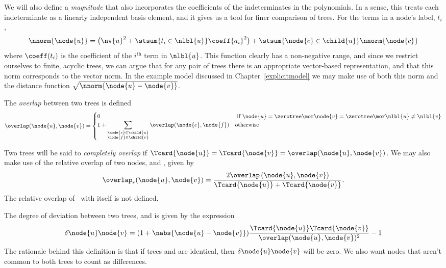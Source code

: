 \begin{definition}\label{magnitude}
  We will also define a \emph{magnitude\/} that also incorporates
  the coefficients of the indeterminates in the polynomials.  In a
  sense, this treats each indeterminate as a linearly independent
  basis element, and it gives us a tool for finer comparison of trees.
  For the terms in a node's label, $t_i$,
  \begin{equation*}
    \nnorm{\node{u}} = \bigl(\nv{u}^2 + \stsum{t_i\in\nlbl{u}}\coeff{a_i}^2\bigr) + \stsum{\node{c}\in\child{u}}\nnorm{\node{c}}
  \end{equation*}
  where $\coeff(t_i)$ is the coefficient of the $i^{\text{th}}$ term in
  $\nlbl{u}$.  This function clearly has a non-negative range, and
  since we restrict ourselves to finite, acyclic trees, we can argue
  that for any pair of trees there is an appropriate vector-based
  representation, and that this norm corresponds to the vector
  norm. In the example model discussed in Chapter~\ref{explicitmodel}
  we may make use of both this norm and the distance function
  $\sqrt{\nnorm{\node{u}-\node{v}}}$.
\end{definition}

\begin{definition}
  The \emph{overlap} between two trees is defined
  \[
  \overlap(\node{u},\node{v}) = \begin{cases}
    0 & \text{ if } \node{u} = \zerotree \mor \node{v} = \zerotree \mor \nlbl{u}\neq\nlbl{v} \\
    1 + \displaystyle\sum_{\substack{\node{e}\in\child{u} \\ \node{f}\in\child{v}}} \overlap(\node{e},\node{f}) & \text{otherwise}
  \end{cases}
  \]

  Two trees will be said to \emph{completely overlap} if
  $\Tcard{\node{u}} = \Tcard{\node{v}} = \overlap(\node{u},\node{v})$.
  We may also make use of the relative overlap of two nodes, 
  and , given by
  \begin{equation*}
    \overlap_{r}(\node{u},\node{v}) = \dfrac{2\overlap\left(\node{u},\node{v}\right)}{\Tcard{\node{u}}+\Tcard{\node{v}}}.
  \end{equation*} The relative overlap of  \tzerotree\ with itself is
  not defined.
\end{definition}


\begin{definition}
  \label{delta-function}
  The degree of deviation between two trees,  and  is given  by the expression
   \begin{equation}
     \delta{\node{u}}{\node{v}} = (1+\nabs{\node{u} - \node{v}})\frac{\Tcard{\node{u}}\Tcard{\node{v}}}{\overlap(\node{u},\node{v})^2} - 1
   \end{equation}
  The rationale behind this definition is that if trees  and  are identical, then
  $\delta{\node{u}}{\node{v}}$ will be zero. We also want nodes that aren't common to both trees to
  count as differences.
\end{definition}

